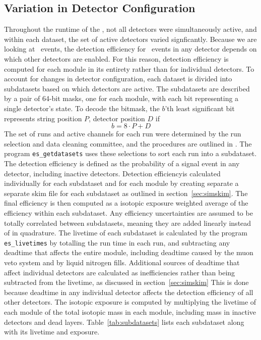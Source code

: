 \documentclass[/main.tex]{subfiles}
\begin{document}
\subsection{Variation in Detector Configuration} \label{sec:sds}
Throughout the runtime of the \MJD, not all detectors were simultaneously active, and within each dataset, the set of active detectors varied signficantly.
Because we are looking at \msmd\ events, the detection efficiency for \bbes\ events in any detector depends on which other detectors are enabled.
For this reason, detection efficiency is computed for each module in its entirety rather than for individual detectors.
To account for changes in detector configuration, each dataset is divided into subdatasets based on which detectors are active.
The subdatasets are described by a pair of 64-bit masks, one for each module, with each bit representing a single detector's state.
To decode the bitmask, the $b$'th least significant bit represents string position $P$, detector position $D$ if
\begin{equation}\label{eq:sdsbitmask}
  b = 8\cdot P + D
\end{equation}
The set of runs and active channels for each run were determined by the run selection and data cleaning committee, and the procedures are outlined in \cite{2018Reine}.
The program \texttt{es\_getdatasets} uses these selections to sort each run into a subdataset.
\\
The detection efficiency is defined as the probability of a signal event in any detector, including inactive detectors.
Detection efficiencyis calculated individually for each subdataset and for each module by creating separate a separate skim file for each subdataset as outlined in section~\ref{sec:simskim}.
The final efficiency is then computed as a isotopic exposure weighted average of the efficiency within each subdataset.
Any efficiency uncertainties are assumed to be totally correlated between subdatasets, meaning they are added linearly instead of in quadrature.
The livetime of each subdataset is calculated by the program \texttt{es\_livetimes} by totalling the run time in each run, and subtracting any deadtime that affects the entire module, including deadtime caused by the muon veto system and by liquid nitrogen fills.
Additional sources of deadtime that affect individual detectors are calculated as inefficiencies rather than being subtracted from the livetime, as discussed in section~\ref{sec:simskim}
This is done because deadtime in any individual detector affects the detection efficiency of all other detectors.
The isotopic exposure is computed by multiplying the livetime of each module of the total isotopic mass in each module, including mass in inactive detectors and dead layers.
Table~\ref{tab:subdatasets} lists each subdataset along with its livetime and exposure.
\end{document}
